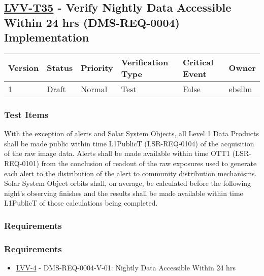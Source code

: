 \hypertarget{lvv-t35---verify-nightly-data-accessible-within-24-hrs-dms-req-0004-implementation}{%
\subsection{\texorpdfstring{\href{https://jira.lsstcorp.org/secure/Tests.jspa\#/testCase/LVV-T35}{LVV-T35}
- Verify Nightly Data Accessible Within 24 hrs (DMS-REQ-0004)
Implementation}{LVV-T35 - Verify Nightly Data Accessible Within 24 hrs (DMS-REQ-0004) Implementation}}\label{lvv-t35---verify-nightly-data-accessible-within-24-hrs-dms-req-0004-implementation}}

\begin{longtable}[]{@{}llllll@{}}
\toprule
Version & Status & Priority & Verification Type & Critical Event &
Owner\tabularnewline
\midrule
\endhead
1 & Draft & Normal & Test & False & ebellm\tabularnewline
\bottomrule
\end{longtable}

\hypertarget{test-items-24}{%
\subsubsection{Test Items}\label{test-items-24}}

With the exception of alerts and Solar System Objects, all Level 1 Data
Products shall be made public within time L1PublicT (LSR-REQ-0104) of
the acquisition of the raw image data. Alerts shall be made available
within time OTT1 (LSR-REQ-0101) from the conclusion of readout of the
raw exposures used to generate each alert to the distribution of the
alert to community distribution mechanisms. Solar System Object orbits
shall, on average, be calculated before the following night's observing
finishes and the results shall be made available within time L1PublicT
of those calculations being completed.

\hypertarget{requirements-48}{%
\subsubsection{Requirements}\label{requirements-48}}

\hypertarget{requirements-49}{%
\subsubsection{Requirements}\label{requirements-49}}

\begin{itemize}
\tightlist
\item
  \href{https://jira.lsstcorp.org/browse/LVV-4}{LVV-4} -
  DMS-REQ-0004-V-01: Nightly Data Accessible Within 24 hrs
\end{itemize}

